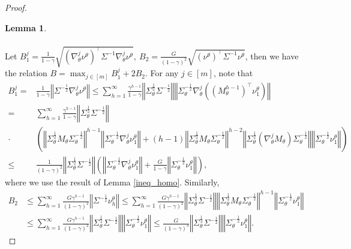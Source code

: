 \documentclass{article}
\newtheorem{lemma}{Lemma}[section]
\numberwithin{equation}{section}
\begin{document}
\begin{proof}
\begin{lemma}
\begin{align*}
\end{align*}
\end{lemma}
Let $B_1^j=\frac{1}{1-\gamma}\sqrt{\left(\nabla^j_\theta\nu^\theta\right)^\top\Sigma^{-1}\nabla^j_\theta\nu^\theta},\ B_2=\frac{G}{(1-\gamma)^2}\sqrt{\left(\nu^\theta\right)^\top\Sigma^{-1}\nu^\theta}$, then we have the relation $B=\max_{j\in[m]}B_1^j+2B_2$. For any $j\in[m]$, note that
\begin{align*}
    B_1^j=&\frac{1}{1-\gamma}\left\Vert\Sigma^{-\frac{1}{2}}\nabla_\theta^j\nu^\theta\right\Vert\leq \sum_{h=1}^\infty \frac{\gamma^{h-1}}{1-\gamma}\left\Vert\Sigma_\theta^{\frac{1}{2}}\Sigma^{-\frac{1}{2}}\right\Vert\left\Vert\Sigma_\theta^{-\frac{1}{2}}\nabla_\theta^j\left(\left(M_\theta^{h-1}\right)^\top\nu^\theta_1\right)\right\Vert\\
    =&\sum_{h=1}^\infty\frac{\gamma^{h-1}}{1-\gamma}\left\Vert\Sigma_\theta^{\frac{1}{2}}\Sigma^{-\frac{1}{2}}\right\Vert\\
    \cdot&\left(\left\Vert\Sigma_\theta^{\frac{1}{2}}M_\theta\Sigma_\theta^{-\frac{1}{2}}\right\Vert^{h-1}\left\Vert\Sigma_\theta^{-\frac{1}{2}}\nabla_\theta^j\nu^\theta_1\right\Vert+(h-1)\left\Vert\Sigma_\theta^{\frac{1}{2}}M_\theta\Sigma_\theta^{-\frac{1}{2}}\right\Vert^{h-2}\left\Vert\Sigma_\theta^{\frac{1}{2}}\left(\nabla_\theta^j M_\theta\right)\Sigma_\theta^{-\frac{1}{2}}\right\Vert\left\Vert\Sigma_\theta^{-\frac{1}{2}}\nu^\theta_1\right\Vert\right)\\
    \leq&\frac{1}{(1-\gamma)^2}\left\Vert\Sigma_\theta^{\frac{1}{2}}\Sigma^{-\frac{1}{2}}\right\Vert\left(\left\Vert\Sigma_\theta^{-\frac{1}{2}}\nabla_\theta^j\nu^\theta_1\right\Vert+\frac{G}{1-\gamma}\left\Vert\Sigma_\theta^{-\frac{1}{2}}\nu^\theta_1\right\Vert\right),
\end{align*}
where we use the result of Lemma \ref{ineq_homo}. Similarly, 
\begin{align*}
    B_2&\leq\sum_{h=1}^\infty\frac{G\gamma^{h-1}}{(1-\gamma)^2}\left\Vert\Sigma^{-\frac{1}{2}}\nu^\theta_h\right\Vert\leq\sum_{h=1}^\infty\frac{G\gamma^{h-1}}{(1-\gamma)^2}\left\Vert\Sigma_\theta^{\frac{1}{2}}\Sigma^{-\frac{1}{2}}\right\Vert\left\Vert\Sigma_\theta^{\frac{1}{2}}M_\theta\Sigma_\theta^{-\frac{1}{2}}\right\Vert^{h-1}\left\Vert\Sigma_\theta^{-\frac{1}{2}}\nu^\theta_1\right\Vert\\
    &\leq\sum_{h=1}^\infty\frac{G\gamma^{h-1}}{(1-\gamma)^2}\left\Vert\Sigma_\theta^{\frac{1}{2}}\Sigma^{-\frac{1}{2}}\right\Vert\left\Vert\Sigma_\theta^{-\frac{1}{2}}\nu^\theta_1\right\Vert\leq \frac{G}{(1-\gamma)^3}\left\Vert\Sigma_\theta^{\frac{1}{2}}\Sigma^{-\frac{1}{2}}\right\Vert\left\Vert\Sigma_\theta^{-\frac{1}{2}}\nu^\theta_1\right\Vert.

\end{align*}
\end{proof}
\end{document}
